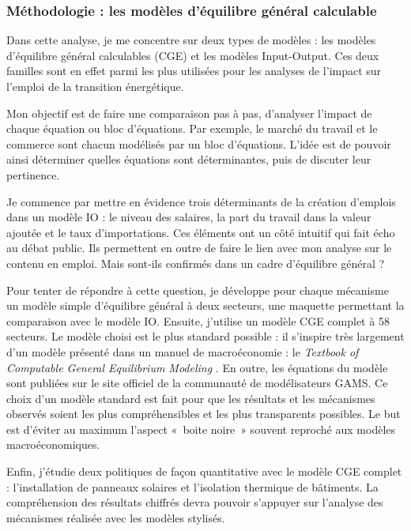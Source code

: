 \subsubsection{Méthodologie : les modèles d'équilibre général calculable}

Dans cette analyse, je me concentre sur deux types de modèles : les modèles d'équilibre général calculables (CGE) et les modèles Input-Output. Ces deux familles sont en effet parmi les plus utilisées pour les analyses de l'impact sur l'emploi de la transition énergétique.

Mon objectif est de faire une comparaison pas à pas, d'analyser l'impact de chaque équation ou bloc d'équations. Par exemple, le marché du travail et le commerce sont chacun modélisés par un bloc d'équations.
L'idée est de pouvoir ainsi déterminer quelles équations sont déterminantes, puis de discuter leur pertinence.

Je commence par mettre en évidence trois déterminants de la création d’emplois dans un modèle IO : le niveau des salaires, la part du travail dans la valeur ajoutée et le taux d’importations. Ces éléments ont un côté intuitif qui fait écho au débat public. Ils permettent en outre de faire le lien avec mon analyse sur le contenu en emploi. Mais sont-ils confirmés dans un cadre d’équilibre général ?

Pour tenter de répondre à cette question, je développe pour chaque mécanisme un modèle simple d’équilibre général à deux secteurs, une maquette permettant la comparaison avec le modèle IO. 
Ensuite, j’utilise un modèle CGE complet à 58 secteurs. 
Le modèle choisi est le plus standard possible : il s'inspire très largement d'un modèle présenté dans un manuel de macroéconomie : le \textit{Textbook of Computable General Equilibrium Modeling} \citep{Hosoe2010}. En outre, les équations du modèle sont publiées sur le site officiel de la communauté de modélisateurs GAMS. Ce choix d'un modèle standard est fait pour que les résultats et les mécanismes observés soient les plus compréhensibles et les plus transparents possibles. Le but est d'éviter au maximum l'aspect «~boite noire~» souvent reproché aux modèles macroéconomiques.

Enfin, j'étudie deux politiques de façon quantitative avec le modèle CGE complet : l'installation de panneaux solaires et l'isolation thermique de bâtiments. La compréhension des résultats chiffrés devra pouvoir s'appuyer sur l'analyse des mécanismes réalisée avec les modèles stylisés.



